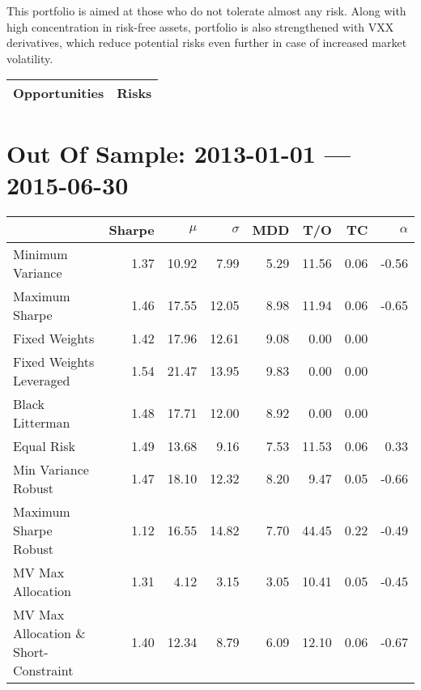\documentclass{scrreprt}
\begin{document}
This portfolio is aimed at those who do not tolerate almost any risk. Along with high concentration in risk-free assets, portfolio is also strengthened with VXX derivatives, which reduce potential risks even further in case of increased market volatility.

\begin{table}[H]
\begin{tabularx}{\textwidth}{XX}
  \toprule
  \textbf{\textsf{Opportunities}} & \textbf{\textsf{Risks}} \\
  \midrule
  \bottomrule
\end{tabularx}
\end{table}

\chapter*{Out Of Sample: 2013-01-01 --- 2015-06-30}
\begin{table}[ht]
\centering
\begin{tabular}{lrrrrrrr}
\toprule
                      & Sharpe & $\mu$ &$\sigma$& MDD & T/O & TC & $\alpha$ \\ 
\midrule
Minimum Variance & 1.37 & 10.92 & 7.99 & 5.29 & 11.56 & 0.06 & -0.56 \\ 
  Maximum Sharpe & 1.46 & 17.55 & 12.05 & 8.98 & 11.94 & 0.06 & -0.65 \\ 
  Fixed Weights & 1.42 & 17.96 & 12.61 & 9.08 & 0.00 & 0.00 &  \\ 
  Fixed Weights Leveraged & 1.54 & 21.47 & 13.95 & 9.83 & 0.00 & 0.00 &  \\ 
  Black Litterman & 1.48 & 17.71 & 12.00 & 8.92 & 0.00 & 0.00 &  \\ 
  Equal Risk & 1.49 & 13.68 & 9.16 & 7.53 & 11.53 & 0.06 & 0.33 \\ 
  Min Variance Robust & 1.47 & 18.10 & 12.32 & 8.20 & 9.47 & 0.05 & -0.66 \\ 
  Maximum Sharpe Robust & 1.12 & 16.55 & 14.82 & 7.70 & 44.45 & 0.22 & -0.49 \\ 
  MV Max Allocation & 1.31 & 4.12 & 3.15 & 3.05 & 10.41 & 0.05 & -0.45 \\ 
  MV Max Allocation \& Short-Constraint & 1.40 & 12.34 & 8.79 & 6.09 & 12.10 & 0.06 & -0.67 \\ 
\bottomrule
\end{tabular}
\end{table}
\end{document}
